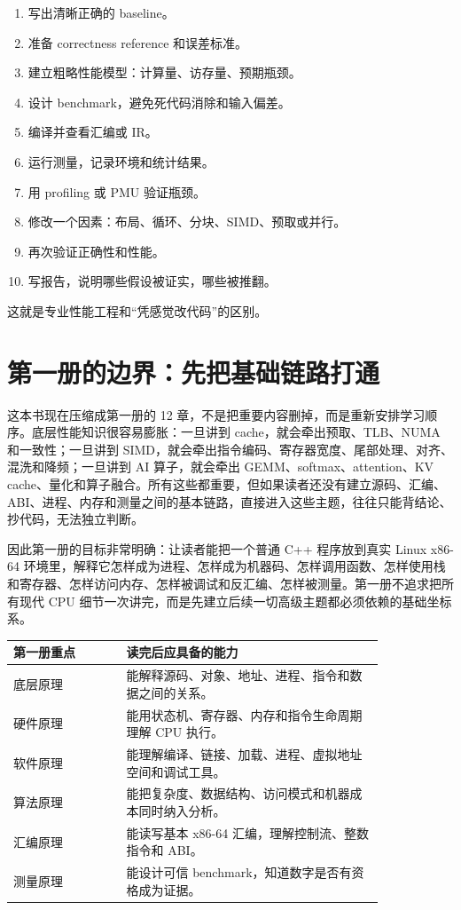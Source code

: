 \begin{enumerate}
  \item 写出清晰正确的 baseline。
  \item 准备 correctness reference 和误差标准。
  \item 建立粗略性能模型：计算量、访存量、预期瓶颈。
  \item 设计 benchmark，避免死代码消除和输入偏差。
  \item 编译并查看汇编或 IR。
  \item 运行测量，记录环境和统计结果。
  \item 用 profiling 或 PMU 验证瓶颈。
  \item 修改一个因素：布局、循环、分块、SIMD、预取或并行。
  \item 再次验证正确性和性能。
  \item 写报告，说明哪些假设被证实，哪些被推翻。
\end{enumerate}

这就是专业性能工程和“凭感觉改代码”的区别。

\section{第一册的边界：先把基础链路打通}

这本书现在压缩成第一册的 12 章，不是把重要内容删掉，而是重新安排学习顺序。底层性能知识很容易膨胀：一旦讲到 cache，就会牵出预取、TLB、NUMA 和一致性；一旦讲到 SIMD，就会牵出指令编码、寄存器宽度、尾部处理、对齐、混洗和降频；一旦讲到 AI 算子，就会牵出 GEMM、softmax、attention、KV cache、量化和算子融合。所有这些都重要，但如果读者还没有建立源码、汇编、ABI、进程、内存和测量之间的基本链路，直接进入这些主题，往往只能背结论、抄代码，无法独立判断。

因此第一册的目标非常明确：让读者能把一个普通 C++ 程序放到真实 Linux x86-64 环境里，解释它怎样成为进程、怎样成为机器码、怎样调用函数、怎样使用栈和寄存器、怎样访问内存、怎样被调试和反汇编、怎样被测量。第一册不追求把所有现代 CPU 细节一次讲完，而是先建立后续一切高级主题都必须依赖的基础坐标系。

\begin{center}
\begin{tabular}{p{0.25\linewidth}p{0.58\linewidth}}
\toprule
第一册重点 & 读完后应具备的能力 \\
\midrule
底层原理 & 能解释源码、对象、地址、进程、指令和数据之间的关系。 \\
硬件原理 & 能用状态机、寄存器、内存和指令生命周期理解 CPU 执行。 \\
软件原理 & 能理解编译、链接、加载、进程、虚拟地址空间和调试工具。 \\
算法原理 & 能把复杂度、数据结构、访问模式和机器成本同时纳入分析。 \\
汇编原理 & 能读写基本 x86-64 汇编，理解控制流、整数指令和 ABI。 \\
测量原理 & 能设计可信 benchmark，知道数字是否有资格成为证据。 \\
\bottomrule
\end{tabular}
\end{center}


